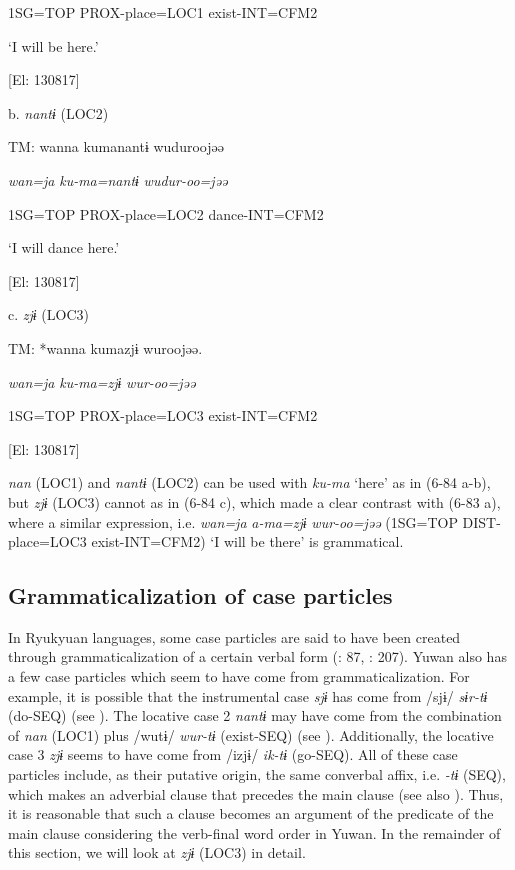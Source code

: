       1SG=TOP  PROX-place=LOC1  exist-INT=CFM2

      ‘I will be here.’

      [El: 130817]

  b.  \textit{nantɨ} (LOC2)

    TM:  wanna  kumanantɨ  wuduroojəə

      \textit{wan=ja}  \textit{ku-ma=nantɨ}  \textit{wudur-oo=jəə}

      1SG=TOP  PROX-place=LOC2  dance-INT=CFM2

      ‘I will dance here.’

      [El: 130817]

  c.  \textit{zjɨ} (LOC3)

    TM:  *wanna  kumazjɨ  wuroojəə.

      \textit{wan=ja}  \textit{ku-ma=zjɨ}  \textit{wur-oo=jəə}

      1SG=TOP  PROX-place=LOC3  exist-INT=CFM2

      [El: 130817]

\textit{nan} (LOC1) and \textit{nantɨ} (LOC2) can be used with \textit{ku-ma} ‘here’ as in (6-84 a-b), but \textit{zjɨ} (LOC3) cannot as in (6-84 c), which made a clear contrast with (6-83 a), where a similar expression, i.e. \textit{wan=ja} \textit{a-ma=zjɨ} \textit{wur-oo=jəə} (1SG=TOP DIST-place=LOC3 exist-INT=CFM2) ‘I will be there’ is grammatical.

\subsection{Grammaticalization of case particles}

In Ryukyuan languages, some case particles are said to have been created through grammaticalization of a certain verbal form (\citealt{NishiokaNakahara2000}: 87, \citealt{Shimoji2008}: 207). Yuwan also has a few case particles which seem to have come from grammaticalization. For example, it is possible that the instrumental case \textit{sjɨ} has come from /sjɨ/ \textit{sɨr-tɨ} (do-SEQ) (see ). The locative case 2 \textit{nantɨ} may have come from the combination of \textit{nan} (LOC1) plus /wutɨ/ \textit{wur-tɨ} (exist-SEQ) (see ). Additionally, the locative case 3 \textit{zjɨ} seems to have come from /izjɨ/ \textit{ik-tɨ} (go-SEQ). All of these case particles include, as their putative origin, the same converbal affix, i.e. \textit{{}-tɨ} (SEQ), which makes an adverbial clause that precedes the main clause (see also ). Thus, it is reasonable that such a clause becomes an argument of the predicate of the main clause considering the verb-final word order in Yuwan. In the remainder of this section, we will look at \textit{zjɨ} (LOC3) in detail.

